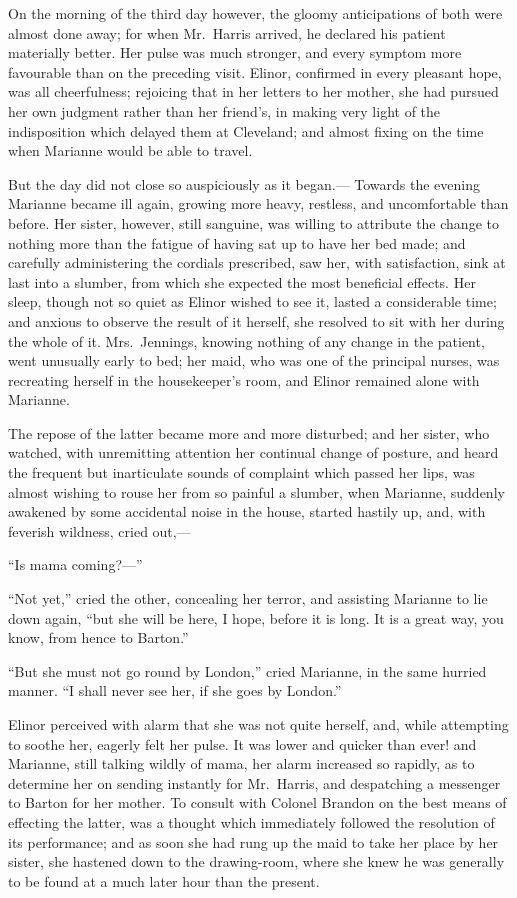 \documentclass{article}
\begin{document}
On the morning of the third day however, the gloomy
anticipations of both were almost done away; for when
Mr.\ Harris arrived, he declared his patient materially better.
Her pulse was much stronger, and every symptom more favourable
than on the preceding visit.  Elinor, confirmed in every
pleasant hope, was all cheerfulness; rejoicing that
in her letters to her mother, she had pursued her own
judgment rather than her friend's, in making very light
of the indisposition which delayed them at Cleveland;
and almost fixing on the time when Marianne would be
able to travel.

But the day did not close so auspiciously as it began.---%
Towards the evening Marianne became ill again, growing
more heavy, restless, and uncomfortable than before.
Her sister, however, still sanguine, was willing to
attribute the change to nothing more than the fatigue
of having sat up to have her bed made; and carefully
administering the cordials prescribed, saw her, with
satisfaction, sink at last into a slumber, from which
she expected the most beneficial effects.  Her sleep,
though not so quiet as Elinor wished to see it,
lasted a considerable time; and anxious to observe
the result of it herself, she resolved to sit with her
during the whole of it.  Mrs.\ Jennings, knowing nothing
of any change in the patient, went unusually early to bed;
her maid, who was one of the principal nurses, was recreating
herself in the housekeeper's room, and Elinor remained
alone with Marianne.

The repose of the latter became more and more disturbed;
and her sister, who watched, with unremitting attention
her continual change of posture, and heard the frequent
but inarticulate sounds of complaint which passed her lips,
was almost wishing to rouse her from so painful a slumber,
when Marianne, suddenly awakened by some accidental noise
in the house, started hastily up, and, with feverish wildness,
cried out,---%

``Is mama coming?---''

``Not yet,'' cried the other, concealing her terror,
and assisting Marianne to lie down again, ``but she will
be here, I hope, before it is long.  It is a great way,
you know, from hence to Barton.''

``But she must not go round by London,'' cried Marianne,
in the same hurried manner.  ``I shall never see her,
if she goes by London.''

Elinor perceived with alarm that she was not
quite herself, and, while attempting to soothe her,
eagerly felt her pulse.  It was lower and quicker than ever!
and Marianne, still talking wildly of mama, her alarm
increased so rapidly, as to determine her on sending
instantly for Mr.\ Harris, and despatching a messenger
to Barton for her mother.  To consult with Colonel Brandon
on the best means of effecting the latter, was a thought
which immediately followed the resolution of its performance;
and as soon she had rung up the maid to take her place
by her sister, she hastened down to the drawing-room,
where she knew he was generally to be found at a much
later hour than the present.
\end{document}
